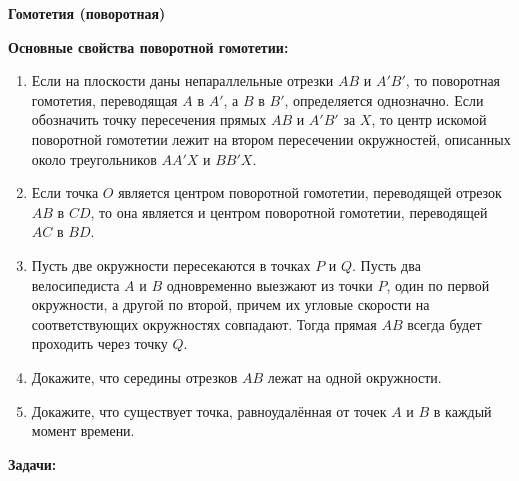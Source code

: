 \documentclass{article}
\begin{document}
\large
	
	\begin{center}
		\textbf{Гомотетия (поворотная)}
	\end{center}
	
	\textbf{Основные свойства поворотной гомотетии:}
	
	\begin{enumerate}[label*=\protect\fbox{\arabic{enumi}}]
		
		\item Если на плоскости даны непараллельные отрезки $AB$ и $A'B'$, то поворотная гомотетия, переводящая $A$ в $A'$, а $B$ в $B'$, определяется однозначно. Если обозначить точку пересечения прямых $AB$ и $A'B'$ за $X$, то центр искомой поворотной гомотетии лежит на втором пересечении окружностей, описанных около треугольников $AA'X$ и $BB'X$.
		
		\item Если точка $O$ является центром поворотной гомотетии, переводящей отрезок $AB$ в $CD$, то она является и центром поворотной гомотетии, переводящей $AC$ в $BD$.
		
		\item Пусть две окружности пересекаются в точках $P$ и $Q$. Пусть два велосипедиста $A$ и $B$ одновременно выезжают из точки $P$, один по первой окружности, а другой по второй, причем их угловые скорости на соответствующих окружностях совпадают. Тогда прямая $AB$ всегда будет проходить через точку $Q$.
		
		\item Докажите, что середины отрезков $AB$ лежат на одной окружности.
		
		\item Докажите, что существует точка, равноудалённая от точек $A$ и $B$ в каждый момент времени.
		
	\end{enumerate}
	
	\textbf{Задачи:}
	
\end{document}
